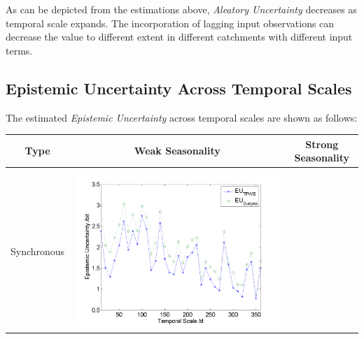 \documentclass[draft,wrr]{AGUTeX}
\begin{document}
\begin{article}
As can be depicted from the estimations above, \emph{Aleatory Uncertainty} decreases  as temporal scale expands. The incorporation of lagging input observations can decrease the value to different extent in different catchments with different input terms. 

\subsection{Epistemic Uncertainty Across Temporal Scales} 
The estimated \emph{Epistemic Uncertainty} across temporal scales are shown as follows:
\begin{table}[H] \small 
\label{eeuu}
\resizebox{\textwidth}{!}
{
\centering
\begin{tabular}{ccc}
\hline
Type& Weak Seasonality & Strong Seasonality \\\hline
\\
Synchronous
&\begin{minipage}{.6\textwidth}\includegraphics[width=\linewidth]{resultgraph/05585000EU.png}\end{minipage}


\end{tabular}}
\end{table}
\end{article}
\end{document}
